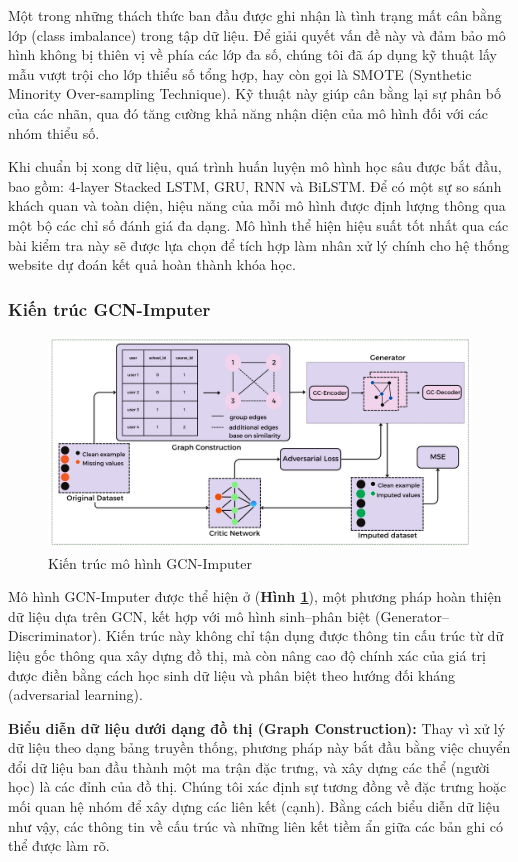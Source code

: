 Một trong những thách thức ban đầu được ghi nhận là tình trạng mất cân bằng lớp (class imbalance) trong tập dữ liệu. Để giải quyết vấn đề này và đảm bảo mô hình không bị thiên vị về phía các lớp đa số, chúng tôi đã áp dụng kỹ thuật lấy mẫu vượt trội cho lớp thiểu số tổng hợp, hay còn gọi là SMOTE (Synthetic Minority Over-sampling Technique). Kỹ thuật này giúp cân bằng lại sự phân bố của các nhãn, qua đó tăng cường khả năng nhận diện của mô hình đối với các nhóm thiểu số.

Khi chuẩn bị xong dữ liệu, quá trình huấn luyện mô hình học sâu được bắt đầu, bao gồm: 4-layer Stacked LSTM, GRU, RNN và BiLSTM. Để có một sự so sánh khách quan và toàn diện, hiệu năng của mỗi mô hình được định lượng thông qua một bộ các chỉ số đánh giá đa dạng. Mô hình thể hiện hiệu suất tốt nhất qua các bài kiểm tra này sẽ được lựa chọn để tích hợp làm nhân xử lý chính cho hệ thống website dự đoán kết quả hoàn thành khóa học.
\subsubsection{Kiến trúc GCN-Imputer}

\begin{figure}[t]
    \centering
    \includegraphics[width = \textwidth]{imgs/gcn-newtone.png}
    \caption{Kiến trúc mô hình GCN-Imputer}
    \label{fig:GCN-Imputer}
\end{figure}
Mô hình GCN-Imputer được thể hiện ở (\textbf{Hình \ref{fig:GCN-Imputer}}), một phương pháp hoàn thiện dữ liệu dựa trên GCN, kết hợp với mô hình sinh–phân biệt (Generator–Discriminator). Kiến trúc này không chỉ tận dụng được thông tin cấu trúc từ dữ liệu gốc thông qua xây dựng đồ thị, mà còn nâng cao độ chính xác của giá trị được điền bằng cách học sinh dữ liệu và phân biệt theo hướng đối kháng (adversarial learning). 

\textbf{Biểu diễn dữ liệu dưới dạng đồ thị (Graph Construction):} Thay vì xử lý dữ liệu theo dạng bảng truyền thống, phương pháp này bắt đầu bằng việc chuyển đổi dữ liệu ban đầu thành một ma trận đặc trưng, và xây dựng các thể (người học) là các đỉnh của đồ thị. Chúng tôi xác định sự tương đồng về đặc trưng hoặc mối quan hệ nhóm để xây dựng các liên kết (cạnh). Bằng cách biểu diễn dữ liệu như vậy, các thông tin về cấu trúc và những liên kết tiềm ẩn giữa các bản ghi có thể được làm rõ.

